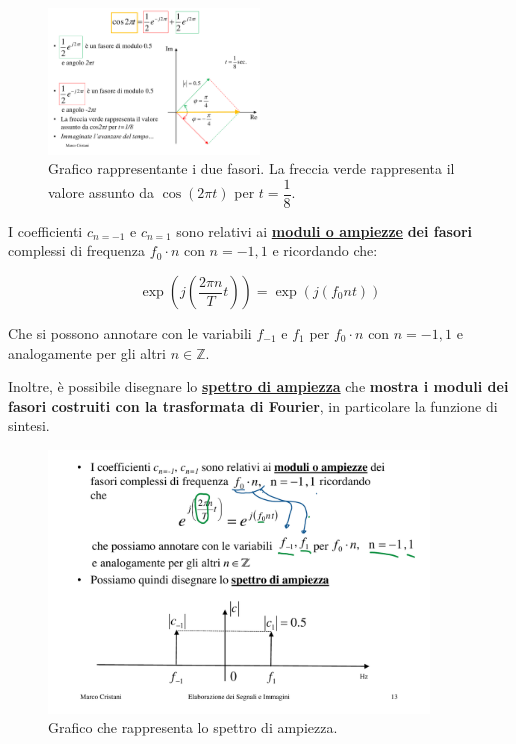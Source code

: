 \documentclass[a4paper]{article}
\begin{document}
	\begin{figure}[!htp]
		\centering
		\includegraphics[width=0.5\textwidth]{img/fourier_eg1.pdf}
		\caption{Grafico rappresentante i due fasori. La freccia verde rappresenta il valore assunto da $\cos{\left(2\pi t\right)}$ per $t = \dfrac{1}{8}$.}
	\end{figure}

	\noindent
	I coefficienti $c_{n = -1}$ e $c_{n = 1}$ sono relativi ai \textbf{\underline{moduli o ampiezze}} \textbf{dei fasori} complessi di frequenza $f_{0} \cdot n$ con $n = -1,1$ e ricordando che:
	
	\begin{equation*}
		\exp\left(j \left(\dfrac{2 \pi n}{T} t\right)\right) = \exp\left(j \left(f_{0} n t\right)\right)
	\end{equation*}

	\noindent
	Che si possono annotare con le variabili $f_{-1}$ e $f_{1}$ per $f_{0} \cdot n$ con $n = -1, 1$ e analogamente per gli altri $n \in \mathbb{Z}$.\newline
	
	\noindent
	Inoltre, è possibile disegnare lo \textbf{\underline{spettro di ampiezza}} che \textbf{mostra i moduli dei fasori costruiti con la trasformata di Fourier}, in particolare la funzione di sintesi.
	
	\begin{figure}[!htp]
		\centering
		\includegraphics[width=0.9\textwidth]{img/fourier_spettro_di_ampiezza.pdf}
		\caption{Grafico che rappresenta lo spettro di ampiezza.}
	\end{figure}
\end{document}
